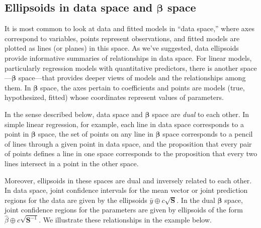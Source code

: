 \documentclass[11pt]{article}%
\renewcommand*{\vec}[1]{\ensuremath{\bm{#1}}}
\newcommand*{\mat}[1]{\ensuremath{\bm{#1}}}
\begin{document}





\subsection[Ellipsoids in data space and beta space]{Ellipsoids in data space and $\vec{\beta}$ space}

It is most common to look at data and fitted models in ``data space,'' where axes correspond to
variables, points represent observations, and fitted models are plotted as lines (or planes) in this space.
As we've suggested, data ellipsoids provide informative summaries of relationships in data space.
For linear models, particularly regression models with quantitative predictors, there is another space---$\vec{\beta}$ space---that provides deeper views of models and the relationships among them.
In $\vec{\beta}$ space, the axes pertain to coefficients and points are models (true, hypothesized, fitted) whose coordinates
represent values of parameters.

In the sense described below, data space and $\vec{\beta}$ space are \emph{dual} to each other.
In simple linear regression, for example, each line in data space corresponds to a point in $\vec{\beta}$ space,
the set of points on any line in $\vec{\beta}$ space corresponds to a pencil of lines through a given point
in data space, and the proposition that every pair of points defines a line in one space corresponds to
the proposition that every two lines intersect in a point in the other space.

Moreover, ellipsoids in these spaces are dual and inversely related to each other.
In data space, joint confidence intervals for the mean vector or joint prediction
regions for the data are given by the ellipsoids $\bar{y} \oplus c \sqrt{\mat{S}}$.
In the dual $\vec{\beta}$ space, joint confidence regions for the parameters
are given by ellipsoids of the form $\hat{\beta} \oplus c \sqrt{\mat{S}^{-1}}$.
We illustrate these relationships in the example below.
\end{document}
